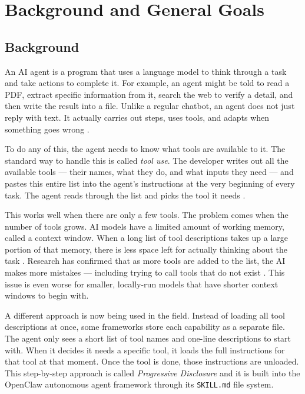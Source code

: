 \section{Background and General Goals}
\label{sec:background}

\subsection{Background}

An AI agent is a program that uses a language model to think through a task and take actions to complete it. For example, an agent might be told to read a PDF, extract specific information from it, search the web to verify a detail, and then write the result into a file. Unlike a regular chatbot, an agent does not just reply with text. It actually carries out steps, uses tools, and adapts when something goes wrong \cite{yao2022react}.

To do any of this, the agent needs to know what tools are available to it. The standard way to handle this is called \textit{tool use}. The developer writes out all the available tools --- their names, what they do, and what inputs they need --- and pastes this entire list into the agent's instructions at the very beginning of every task. The agent reads through the list and picks the tool it needs \cite{schick2023toolformer}.

This works well when there are only a few tools. The problem comes when the number of tools grows. AI models have a limited amount of working memory, called a context window. When a long list of tool descriptions takes up a large portion of that memory, there is less space left for actually thinking about the task \cite{shi2024context}. Research has confirmed that as more tools are added to the list, the AI makes more mistakes --- including trying to call tools that do not exist \cite{patil2023gorilla}. This issue is even worse for smaller, locally-run models that have shorter context windows to begin with.

A different approach is now being used in the field. Instead of loading all tool descriptions at once, some frameworks store each capability as a separate file. The agent only sees a short list of tool names and one-line descriptions to start with. When it decides it needs a specific tool, it loads the full instructions for that tool at that moment. Once the tool is done, those instructions are unloaded. This step-by-step approach is called \textit{Progressive Disclosure} and it is built into the OpenClaw autonomous agent framework \cite{openclaw_2025} through its \texttt{SKILL.md} file system.

